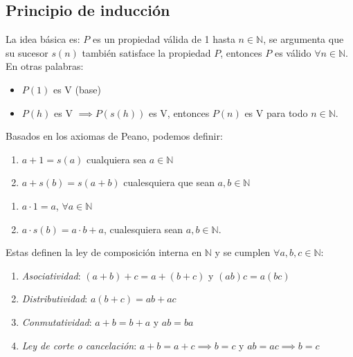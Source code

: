 \subsection{Principio de inducción} \label{sec:induccion}  
La idea básica es: $P$ es un propiedad válida de 1 hasta $n \in \mathbb{N}$, se argumenta que su sucesor $s(n)$ también satisface la propiedad $P$, entonces $P$ es válido $\forall n \in \mathbb{N}$. En otras palabras:

\begin{itemize}
	\item $P(1)$ es V (base)
	\item $P(h)$ es V $\implies P(s(h))$ es V, entonces $P(n)$ es V para todo $n \in \mathbb{N}$.
\end{itemize}

Basados en los axiomas de Peano, podemos definir:

\begin{fmd-definition}[Adición en $\N$]
	\begin{enumerate}[label=\alph*)]
		\item $a + 1 = s(a)$ cualquiera sea $a \in \mathbb{N}$
		\item $a + s(b) = s(a + b)$ cualesquiera que sean $a, b \in \mathbb{N}$
	\end{enumerate}
\end{fmd-definition}

\begin{fmd-definition}[Multiplicación en $\N$]
	\begin{enumerate}[label=\alph*)]
		\item $a \cdot 1 = a$, $\forall a \in \mathbb{N}$
		\item $a \cdot s(b) = a \cdot b + a$, cualesquiera sean $a, b \in \mathbb{N}$.
	\end{enumerate}
\end{fmd-definition}

Estas definen la ley de composición interna en $\mathbb{N}$ y se cumplen $\forall a, b, c \in \mathbb{N}$:
\begin{enumerate}
	\item \textit{Asociatividad}: $(a+b)+c = a + (b+c)$ y $(ab)c = a(bc)$
	\item \textit{Distributividad}: $a(b+c) = ab + ac$
	\item \textit{Conmutatividad}: $a + b = b + a$ y $ab = ba$
	\item \textit{Ley de corte o cancelación}: $a+b = a + c \implies b=c$ y $ab=ac \implies b=c$
\end{enumerate}

